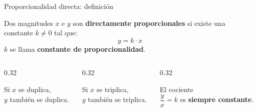 \documentclass[aspectratio=169, 10pt, spanish]{beamer}
\begin{document}

\begin{frame}{Proporcionalidad directa: definición}
  \begin{teoriabox}
    Dos magnitudes $x$ e $y$ son \textbf{directamente proporcionales} si existe una constante $k \neq 0$ tal que:
    \[
      \boxed{y = k \cdot x}
    \]
    $k$ se llama \textbf{constante de proporcionalidad}.
  \end{teoriabox}
  \vspace{0.3cm}
  \begin{columns}[t]
    \begin{column}{0.32\textwidth}
      \begin{notabox}[Duplicar]
        Si $x$ se duplica,\\$y$ también se duplica.
      \end{notabox}
    \end{column}
    \begin{column}{0.32\textwidth}
      \begin{notabox}[Triplicar]
        Si $x$ se triplica,\\$y$ también se triplica.
      \end{notabox}
    \end{column}
    \begin{column}{0.32\textwidth}
      \begin{notabox}[Cociente]
        El cociente\\$\dfrac{y}{x} = k$ es \textbf{siempre constante}.
      \end{notabox}
    \end{column}
  \end{columns}
  \vspace{0.35cm}
  \begin{center}
  \end{center}
\end{frame}
\end{document}
